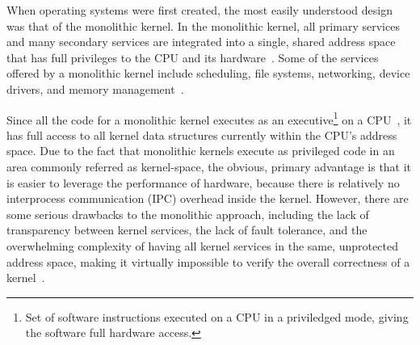
When operating systems were first created, the most easily understood
design was that of the monolithic kernel.  In the monolithic kernel, all
primary services and many secondary services are integrated into a single,
shared address space that has full privileges to the CPU and its
hardware~\cite{liedtke1996}.  Some of the services offered by a monolithic
kernel include scheduling, file systems, networking, device drivers, and
memory management~\cite{stallings2005}.

Since all the code for a monolithic kernel executes as an
executive\footnote{Set of software instructions executed on a CPU in a
priviledged mode, giving the software full hardware access.}
on a CPU~\cite{ia32-1-2004}, it has full access to all kernel
data structures currently within the CPU's address space.
Due to the fact that monolithic kernels execute as privileged code in an area
commonly referred as kernel-space, the obvious, primary advantage is
that it is easier to leverage the performance of hardware, because there
is relatively no interprocess communication (IPC) overhead inside the
kernel.  However, there are some serious drawbacks to the monolithic approach,
including the lack of
transparency between kernel services, the lack of fault tolerance, and the
overwhelming complexity of having all kernel services in the same,
unprotected address space, making it virtually impossible to verify the
overall correctness of a kernel~\cite{stallings2005}.

